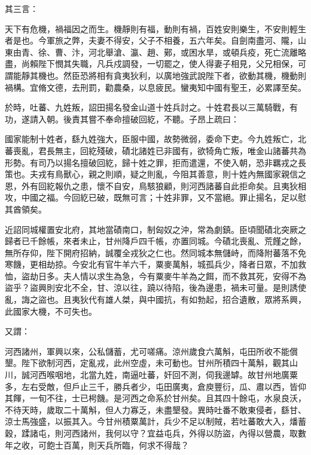 \begin{pinyinscope}
 其三言：



 天下有危機，禍福因之而生。機靜則有福，動則有禍，百姓安則樂生，不安則輕生者是也。今軍旅之弊，夫妻不得安，父子不相養，五六年矣。自劍南盡河、隴，山東由青、徐、曹、汴，河北舉滄、瀛、趙、鄚，或困水旱，或頓兵疫，死亡流離略盡，尚賴陛下憫其失職，凡兵戍調發，一切罷之，使人得妻子相見，父兄相保，可謂能靜其機也。然臣恐將相有貪夷狄利，以廣地強武說陛下者，欲動其機，機動則禍構。宜脩文德，去刑罰，勸農桑，以息疲民。蠻夷知中國有聖王，必累譯至矣。



 於時，吐蕃、九姓叛，詔田揚名發金山道十姓兵討之。十姓君長以三萬騎戰，有功，遂請入朝。後責其嘗不奉命擅破回紇，不聽。子昂上疏曰：



 國家能制十姓者，繇九姓強大，臣服中國，故勢微弱，委命下吏。今九姓叛亡，北蕃喪亂，君長無主，回紇殘破，磧北諸姓已非國有，欲犄角亡叛，唯金山諸蕃共為形勢。有司乃以揚名擅破回紇，歸十姓之罪，拒而遣還，不使入朝，恐非羈戎之長策也。夫戎有鳥獸心，親之則順，疑之則亂，今阻其善意，則十姓內無國家親信之恩，外有回紇報仇之患，懷不自安，鳥駭狼顧，則河西諸蕃自此拒命矣。且夷狄相攻，中國之福。今回紇已破，既無可言；十姓非罪，又不當絕。罪止揚名，足以慰其酋領矣。



 近詔同城權置安北府，其地當磧南口，制匈奴之沖，常為劇鎮。臣頃聞磧北突厥之歸者已千餘帳，來者未止，甘州降戶四千帳，亦置同城。今磧北喪亂、荒饉之餘，無所存仰，陛下開府招納，誠覆全戎狄之仁也。然同城本無儲峙，而降附蕃落不免寒饑，更相劫掠。今安北有官牛羊六千，粟麥萬斛，城孤兵少，降者日眾，不加救恤，盜劫日多。夫人情以求生為急，今有粟麥牛羊為之餌，而不救其死，安得不為盜乎？盜興則安北不全，甘、涼以往，蹺以待陷，後為邊患，禍未可量。是則誘使亂，誨之盜也。且夷狄代有雄人桀，與中國抗，有如勃起，招合遺散，眾將系興，此國家大機，不可失也。



 又謂：



 河西諸州，軍興以來，公私儲蓄，尤可嗟痛。涼州歲食六萬斛，屯田所收不能償墾。陛下欲制河西，定亂戎，此州空虛，未可動也。甘州所積四十萬斛，觀其山川，誠河西喉咽地，北當九姓，南逼吐蕃，奸回不測，伺我邊罅。故甘州地廣粟多，左右受敵，但戶止三千，勝兵者少，屯田廣夷，倉庾豐衍，瓜、肅以西，皆仰其餫，一旬不往，士已枵饑。是河西之命系於甘州矣。且其四十餘屯，水泉良沃，不待天時，歲取二十萬斛，但人力寡乏，未盡墾發。異時吐番不敢東侵者，繇甘、涼士馬強盛，以振其入。今甘州積粟萬計，兵少不足以制賊，若吐蕃敢大入，燔蓄穀，蹂諸屯，則河西諸州，我何以守？宜益屯兵，外得以防盜，內得以營農，取數年之收，可飽士百萬，則天兵所臨，何求不得哉？




\end{pinyinscope}
